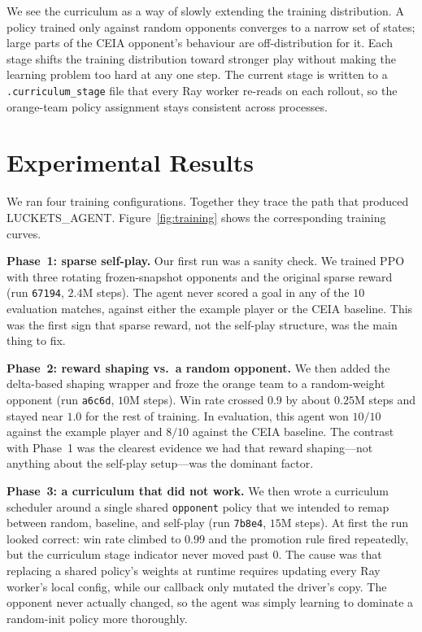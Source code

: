\documentclass{article}
\begin{document}
We see the curriculum as a way of slowly extending the training distribution.
A policy trained only against random opponents converges to a narrow set of states; large parts of the CEIA opponent's behaviour are off-distribution for it.
Each stage shifts the training distribution toward stronger play without making the learning problem too hard at any one step.
The current stage is written to a \texttt{.curriculum\_stage} file that every Ray worker re-reads on each rollout, so the orange-team policy assignment stays consistent across processes.

\section{Experimental Results}
\label{sec:result}

We ran four training configurations.
Together they trace the path that produced LUCKETS\_AGENT.
Figure~\ref{fig:training} shows the corresponding training curves.

\textbf{Phase~1: sparse self-play.}
Our first run was a sanity check.
We trained PPO with three rotating frozen-snapshot opponents and the original sparse reward (run \texttt{67194}, $2.4$M steps).
The agent never scored a goal in any of the $10$ evaluation matches, against either the example player or the CEIA baseline.
This was the first sign that sparse reward, not the self-play structure, was the main thing to fix.

\textbf{Phase~2: reward shaping vs.\ a random opponent.}
We then added the delta-based shaping wrapper and froze the orange team to a random-weight opponent (run \texttt{a6c6d}, $10$M steps).
Win rate crossed $0.9$ by about $0.25$M steps and stayed near $1.0$ for the rest of training.
In evaluation, this agent won $10/10$ against the example player and $8/10$ against the CEIA baseline.
The contrast with Phase~1 was the clearest evidence we had that reward shaping---not anything about the self-play setup---was the dominant factor.

\textbf{Phase~3: a curriculum that did not work.}
We then wrote a curriculum scheduler around a single shared \texttt{opponent} policy that we intended to remap between random, baseline, and self-play (run \texttt{7b8e4}, $15$M steps).
At first the run looked correct: win rate climbed to $0.99$ and the promotion rule fired repeatedly, but the curriculum stage indicator never moved past $0$.
The cause was that replacing a shared policy's weights at runtime requires updating every Ray worker's local config, while our callback only mutated the driver's copy.
The opponent never actually changed, so the agent was simply learning to dominate a random-init policy more thoroughly.
\end{document}
